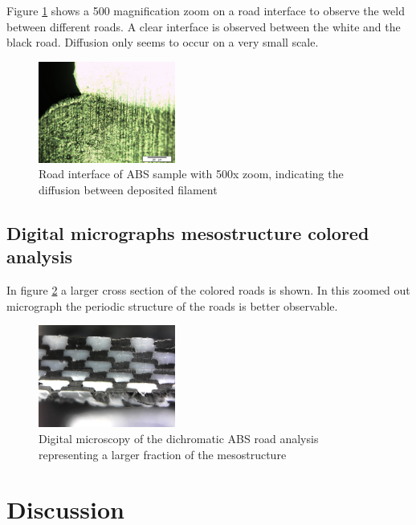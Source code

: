 Figure \ref{fig:colored500x} shows a 500 magnification zoom on a road interface to observe the weld between different roads. A clear interface is observed between the white and the black road. Diffusion only seems to occur on a very small scale.
\begin{figure}[H]
    \centering
    \includegraphics[width=0.4\textwidth]{chapter_4_RVE_Definition/figures/colored/Tv89_LI.jpg}
    \caption{Road interface of ABS sample with 500x zoom, indicating the diffusion between deposited filament}
    \label{fig:colored500x}
\end{figure}

\subsection{Digital micrographs  mesostructure colored analysis}

In figure \ref{fig:digitalcolored} a larger cross section of the colored roads is shown. In this zoomed out micrograph the periodic structure of the roads is better observable.
\begin{figure}[H]
    \centering
    \includegraphics[width=0.40\textwidth]{chapter_4_RVE_Definition/figures/colored/Digitalcolored.jpg}
    \caption{Digital microscopy of the dichromatic ABS road analysis representing a larger fraction of the mesostructure}
    \label{fig:digitalcolored}
\end{figure}

\section{Discussion}
